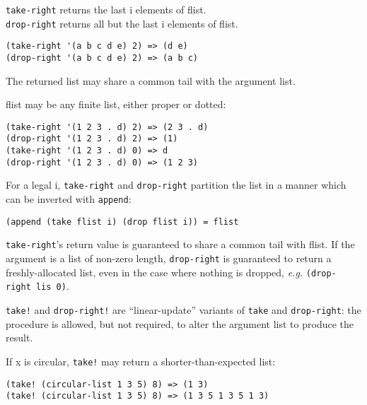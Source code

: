 \begin{entry}{%
  }

  \texttt{take-right} returns the last i elements of flist.\\
  \texttt{drop-right} returns all but the last i elements of flist.

\begin{verbatim}
(take-right '(a b c d e) 2) => (d e)
(drop-right '(a b c d e) 2) => (a b c)
\end{verbatim}

  The returned list may share a common tail with the argument list.

  flist may be any finite list, either proper or dotted:

\begin{verbatim}
(take-right '(1 2 3 . d) 2) => (2 3 . d)
(drop-right '(1 2 3 . d) 2) => (1)
(take-right '(1 2 3 . d) 0) => d
(drop-right '(1 2 3 . d) 0) => (1 2 3)
\end{verbatim}

  For a legal i, \texttt{take-right} and \texttt{drop-right} partition
  the list in a manner which can be inverted with \texttt{append}:

\begin{verbatim}
(append (take flist i) (drop flist i)) = flist
\end{verbatim}

  \texttt{take-right}'s return value is guaranteed to share a common
  tail with flist. If the argument is a list of non-zero length,
  \texttt{drop-right} is guaranteed to return a freshly-allocated
  list, even in the case where nothing is dropped, \emph{e.g.}
  \texttt{(drop-right\ lis\ 0)}.
\end{entry}

\begin{entry}{%
  }

\texttt{take!}  and \texttt{drop-right!} are ``linear-update''
variants of \texttt{take} and \texttt{drop-right}: the procedure is
allowed, but not required, to alter the argument list to produce the
result.

  If x is circular, \texttt{take!} may return a shorter-than-expected
  list:

\begin{verbatim}
(take! (circular-list 1 3 5) 8) => (1 3)
(take! (circular-list 1 3 5) 8) => (1 3 5 1 3 5 1 3)
\end{verbatim}
\end{entry}

